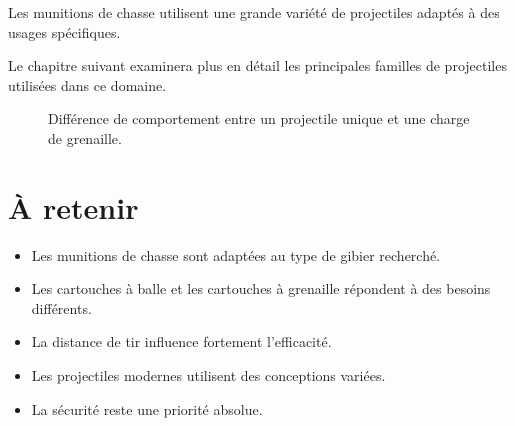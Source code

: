 Les munitions de chasse utilisent une grande variété de projectiles adaptés à
des usages spécifiques.

Le chapitre suivant examinera plus en détail les principales familles de
projectiles utilisées dans ce domaine.

\begin{figure}[htbp]
\centering


\caption{Différence de comportement entre un projectile unique et une charge de grenaille.}
\label{fig:balle_vs_grenaille}

\end{figure}

\section{À retenir}

\begin{aretenir}

\begin{itemize}
    \item Les munitions de chasse sont adaptées au type de gibier recherché.
    \item Les cartouches à balle et les cartouches à grenaille répondent à des
          besoins différents.
    \item La distance de tir influence fortement l'efficacité.
    \item Les projectiles modernes utilisent des conceptions variées.
    \item La sécurité reste une priorité absolue.
\end{itemize}

\end{aretenir}
